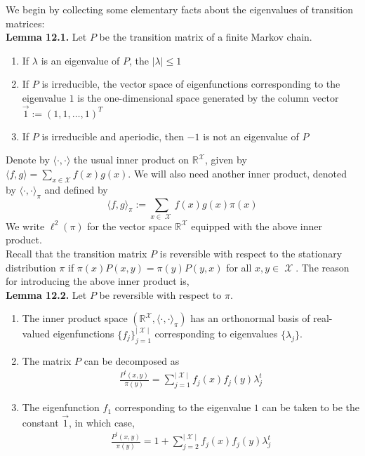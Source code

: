 \documentclass[12pt]{article}
\DeclareMathOperator*{\X}{\mathcal{X}}
\begin{document}
We begin by collecting some elementary facts about the eigenvalues of transition matrices:\\

\textbf{Lemma 12.1.} Let $P$ be the transition matrix of a finite Markov chain.
\begin{enumerate}
\item If $\lambda$ is an eigenvalue of $P$, the $|\lambda| \leq 1$
\item If $P$ is irreducible, the vector space of eigenfunctions corresponding to the eigenvalue $1$ is the one-dimensional space generated by the column vector $\vec{1} := (1, 1, \ldots, 1)^T$
\item If $P$ is irreducible and aperiodic, then $-1$ is not an eigenvalue of $P$
\end{enumerate}

Denote by $\langle \cdot, \cdot \rangle$ the usual inner product on $\mathbb{R}^{\mathcal{X}}$, given by $\langle f, g \rangle = \sum_{x \in \mathcal{X}} f(x) g(x)$. We will also need another inner product, denoted by $\langle \cdot, \cdot \rangle_{\pi}$ and defined by $$\langle f, g \rangle_{\pi} := \sum_{x \in \X} f(x)g(x) \pi(x)$$ We write $\ell^2(\pi)$ for the vector space $\mathbb{R}^{\mathcal{X}}$ equipped with the above inner product.\\

Recall that the transition matrix $P$ is reversible with respect to the stationary distribution $\pi$ if $\pi(x) P(x,y) = \pi(y) P(y,x)$ for all $x, y \in \X$. The reason for introducing the above inner product is,\\

\textbf{Lemma 12.2.} Let $P$ be reversible with respect to $\pi$.
\begin{enumerate}
\item The inner product space $(\mathbb{R}^{\X}, \langle \cdot, \cdot \rangle_{\pi})$ has an orthonormal basis of real-valued eigenfunctions $\{f_j\}_{j=1}^{|\X|}$ corresponding to eigenvalues $\{\lambda_j\}$.
\item The matrix $P$ can be decomposed as
\begin{align*}
\frac{P^t(x, y)}{\pi(y)} = \sum_{j=1}^{|\X|} f_j(x) f_j(y) \lambda_j^t
\end{align*}
\item The eigenfunction $f_1$ corresponding to the eigenvalue $1$ can be taken to be the constant $\vec{1}$, in which case,
\begin{align*}
\frac{P^t(x,y)}{\pi(y)} = 1 + \sum_{j=2}^{|\X|} f_j(x) f_j(y) \lambda_j^t
\end{align*}
\end{enumerate}
\end{document}
